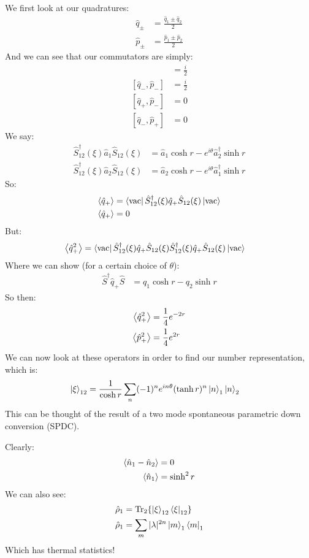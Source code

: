 We first look at our quadratures:
\begin{align*}
	\hat{q}_\pm &= \frac{\hat{q}_1 \pm \hat{q}_2}{2} \\
	\hat{p}_\pm &= \frac{\hat{p}_1 \pm \hat{p}_2}{2}
\end{align*}
And we can see that our commutators are simply:
\begin{align*}
	[\hat{q}_+,\hat{p}_+] &= \frac{i}{2} \\
	[\hat{q}_-,\hat{p}_-] &= \frac{i}{2} \\
	[\hat{q}_+,\hat{p}_-] &= 0 \\
	[\hat{q}_-,\hat{p}_+] &= 0
\end{align*}
We say:
\begin{align*}
	\hat{S}_{12}^\dagger(\xi)\hat{a}_1\hat{S}_{12}(\xi) &= \hat{a}_1\cosh r - e^{i\theta} \hat{a}_2^\dagger\sinh r \\
	\hat{S}_{12}^\dagger(\xi)\hat{a}_2\hat{S}_{12}(\xi) &= \hat{a}_2\cosh r - e^{i\theta}\hat{a}_1^\dagger \sinh r
\end{align*}
So:
\begin{align*}
	\expval{\hat{q}_+} &= \bra{\text{vac}}\hat{S}_{12}^\dagger(\xi)\hat{q}_+\hat{S}_{12}(\xi)\ket{\text{vac}} \\
	\expval{\hat{q}_+} &= 0
\end{align*}
But:
\begin{align*}
	\expval{\hat{q}_+^2} &= \bra{\text{vac}}\hat{S}_{12}^\dagger(\xi)\hat{q}_+\hat{S}_{12}(\xi)\hat{S}^\dagger_{12}(\xi)\hat{q}_+\hat{S}_{12}(\xi)\ket{\text{vac}}
\end{align*}
Where we can show (for a certain choice of $\theta$):
\begin{align*}
	\hat{S}^\dagger\hat{q}_+\hat{S} &= q_1\cosh r - q_2\sinh r
\end{align*}
So then:
\begin{align*}
	\expval{\hat{q}_+^2} &= \frac{1}{4} e^{-2r} \\
	\expval{\hat{p}_+^2} &= \frac{1}{4} e^{2r}
\end{align*}
We can now look at these operators in order to find our number representation, which is:
\begin{align*}
	\ket{\xi}_{12} &= \frac{1}{\cosh r} \sum_n (-1)^n e^{in\theta}(\tanh r)^n \ket{n}_1\ket{n}_2
\end{align*}
This can be thought of the result of a two mode spontaneous parametric down conversion (SPDC).

Clearly:
\begin{align*}
	\expval{\hat{n}_1 - \hat{n}_2} &= 0 \\
	\expval{\hat{n}_1} &= \sinh^2 r
\end{align*}
We can also see:
\begin{align*}
	\hat{\rho}_1 &=\Tr_2\{\ket{\xi}_{12}\bra{\xi}_{12}\} \\
	\hat{\rho}_1 &=\sum_m |\lambda|^{2n}\ket{m}_1\bra{m}_1
\end{align*}
Which has thermal statistics!
